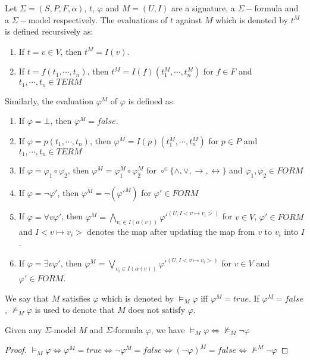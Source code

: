 \begin{definition}
Let $\Sigma = (S, P, F, \alpha)$, $t$, $\varphi$ and $M=(U, I)$ are a signature, a $\Sigma-$formula and a $\Sigma-$model respectively. The evaluations of $t$ against $M$ which is denoted by $t^M$ is defined recursively as:
\begin{enumerate}
\item If $t = v \in V$, then $t^M = I(v)$.
\item If $t = f(t_1, \cdots, t_n)$, then $t^M = I(f)(t_1^M, \cdots, t_n^M)$ for $f \in F$ and $t_1,\cdots, t_n \in TERM$
\end{enumerate}
Similarly, the evaluation $\varphi^M$ of $\varphi$ is defined as:
\begin{enumerate}
\item If $\varphi = \bot$, then $\varphi^M = false$.
\item If $\varphi = p(t_1,\cdots,t_n)$, then $\varphi^M = I(p)(t_1^M,\cdots,t_n^M)$ for $p \in P$ and $t_1,\cdots, t_n \in TERM$
\item If $\varphi = \varphi_1 \circ \varphi_2$, then $\varphi^M = \varphi_1^M \circ \varphi_2^M$ for $\circ ^\in \{\wedge, \vee, \rightarrow, \leftrightarrow\}$ and $\varphi_1, \varphi_2 \in FORM$
\item If $\varphi = \neg\varphi'$, then $\varphi^M = \neg(\varphi'^M)$ for $\varphi' \in FORM$
\item If $\varphi = \forall v \varphi'$, then $\varphi^M = \bigwedge\limits_{v_i \in I(\alpha(v))}\varphi'^{(U, I<v \mapsto v_i>)}$ for $v \in V$,  $\varphi' \in FORM$ and $I<v \mapsto v_i>$ denotes the map after updating the map from $v$ to $v_i$ into $I$.
\item If $\varphi = \exists v \varphi'$, then $\varphi^M = \bigvee\limits_{v_i \in I(\alpha(v))}\varphi'^{(U, I<v \mapsto v_i>)}$ for $v \in V$ and  $\varphi' \in FORM$.
\end{enumerate}
We say that $M$ satisfies $\varphi$ which is denoted by $\models_M \varphi$ iff $\varphi^M = true$. If $\varphi^M = false$, $\not\models_M \varphi$ is used to denote that $M$ does not satisfy $\varphi$.
\end{definition}

\begin{lemma}\label{lemma:model-sat-unsat}
Given any $\Sigma$-model $M$ and $\Sigma$-formula $\varphi$, we have $\models_M \varphi \iff \not\models_M \neg \varphi$
\end{lemma}

\begin{proof}
$\models_M \varphi \iff \varphi^M = true \iff \neg \varphi^M = false \iff (\neg \varphi)^M = false \iff \not\models^M \neg \varphi$
\end{proof}

